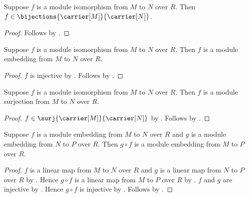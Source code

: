 \begin{proposition}\label{module_isomorphism_is_bijection}
    Suppose $f$ is a module isomorphism from $M$ to $N$ over $R$.
    Then $f\in\bijections{\carrier[M]}{\carrier[N]}$.
\end{proposition}
\begin{proof}
    Follows by .
\end{proof}

\begin{corollary}\label{module_isomorphism_is_embedding}
    Suppose $f$ is a module isomorphism from $M$ to $N$ over $R$.
    Then $f$ is a module embedding from $M$ to $N$ over $R$.
\end{corollary}
\begin{proof}
    $f$ is injective by
        .
    Follows by
        .
\end{proof}

\begin{corollary}\label{module_isomorphism_is_surjection}
    Suppose $f$ is a module isomorphism from $M$ to $N$ over $R$.
    Then $f$ is a module surjection from $M$ to $N$ over $R$.
\end{corollary}
\begin{proof}
    $f\in\surj{\carrier[M]}{\carrier[N]}$ by
        .
    Follows by
        .
\end{proof}

\begin{theorem}\label{module_embedding_composition}
    Suppose $f$ is a module embedding from $M$ to $N$ over $R$ and
        $g$ is a module embedding from $N$ to $P$ over $R$.
    Then $g\circ f$ is a module embedding from $M$ to $P$ over $R$.
\end{theorem}
\begin{proof}
    $f$ is a linear map from $M$ to $N$ over $R$ and
        $g$ is a linear map from $N$ to $P$ over $R$ by
        .
    Hence $g\circ f$ is a linear map from $M$ to $P$ over $R$ by
        .
    $f$ and $g$ are injective by
        .
    Hence $g\circ f$ is injective by .
    Follows by .
\end{proof}

